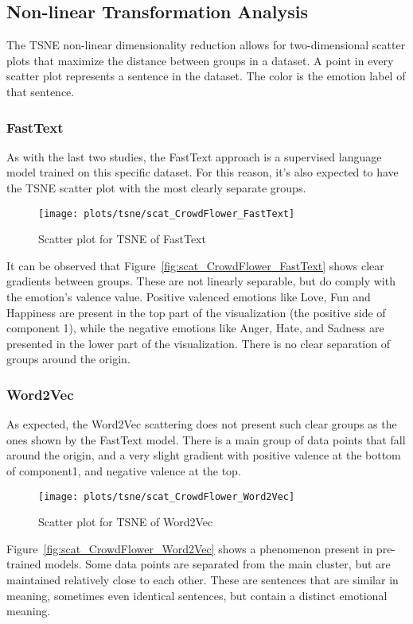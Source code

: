 \subsection{Non-linear Transformation Analysis}\label{sub:Non-linear Transformation Analysis}
The TSNE non-linear dimensionality reduction allows for two-dimensional scatter plots that maximize the distance between groups in a dataset. A point in every scatter plot represents a sentence in the dataset. The color is the emotion label of that sentence.
\subsubsection{FastText}
As with the last two studies, the FastText approach is a supervised language model trained on this specific dataset. For this reason, it's also expected to have the TSNE scatter plot with the most clearly separate groups.
\begin{figure}[H]
  \texttt{[image: plots/tsne/scat\_CrowdFlower\_FastText]}
  \centering
  \caption{Scatter plot for TSNE of FastText}
\end{figure}\label{fig:scat_CrowdFlower_FastText}
It can be observed that Figure~\ref{fig:scat_CrowdFlower_FastText} shows clear gradients between groups. These are not linearly separable, but do comply with the emotion's valence value. Positive valenced emotions like Love, Fun and Happiness are present in the top part of the visualization (the positive side of component 1), while the negative emotions like Anger, Hate, and Sadness are presented in the lower part of the visualization. There is no clear separation of groups around the origin.
\subsubsection{Word2Vec}
As expected, the Word2Vec scattering does not present such clear groups as the ones shown by the FastText model. There is a main group of data points that fall around the origin, and a very slight gradient with positive valence at the bottom of component1, and negative valence at the top.
\begin{figure}[H]
  \texttt{[image: plots/tsne/scat\_CrowdFlower\_Word2Vec]}
  \centering
  \caption{Scatter plot for TSNE of Word2Vec}
\end{figure}\label{fig:scat_CrowdFlower_Word2Vec}
Figure~\ref{fig:scat_CrowdFlower_Word2Vec} shows a phenomenon present in pre-trained models. Some data points are separated from the main cluster, but are maintained relatively close to each other. These are sentences that are similar in meaning, sometimes even identical sentences, but contain a distinct emotional meaning.
